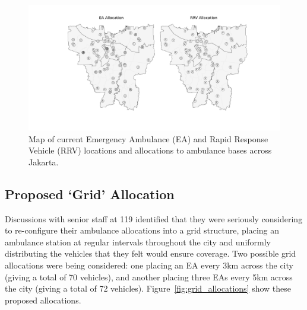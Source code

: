 \documentclass[preprint,12pt]{elsarticle}
\begin{document}
\begin{figure}
\begin{center}
\includegraphics[width=\textwidth]{img/map_current}
\caption{Map of current Emergency Ambulance (EA) and Rapid Response Vehicle (RRV) locations and allocations to ambulance bases across Jakarta.}
\label{fig:current_allocation}
\end{center}
\end{figure}

\subsection{Proposed `Grid' Allocation}\label{sec:analysis_grid}
Discussions with senior staff at 119 identified that they were seriously considering to re-configure their ambulance allocations into a grid structure, placing an ambulance station at regular intervals throughout the city and uniformly distributing the vehicles that they felt would ensure coverage. Two possible grid allocations were being considered: one placing an EA every 3km across the city (giving a total of 70 vehicles), and another placing three EAs every 5km across the city (giving a total of 72 vehicles). Figure~\ref{fig:grid_allocations} show these proposed allocations.
\end{document}
